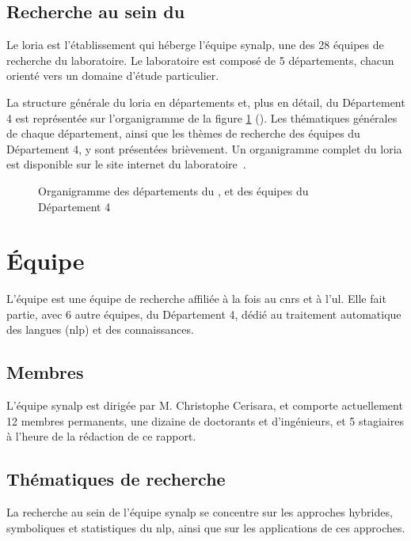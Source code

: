 \pagebreak
\subsection{Recherche au sein du }
Le \gls{loria} est l'établissement qui héberge l'équipe \gls{synalp}, une des 28 équipes de recherche du laboratoire. Le laboratoire est composé de 5 départements, chacun orienté vers un domaine d'étude particulier.

La structure générale du \gls{loria} en départements et, plus en détail, du Département 4 est représentée sur l'organigramme de la figure \ref{fig:dep_org} (). %
Les thématiques générales de chaque département, ainsi que les thèmes de recherche des équipes du Département 4, y sont présentées brièvement.
Un organigramme complet du \gls{loria} est disponible sur {le site internet du laboratoire~\autocite{org_loria}}.

\begin{figure}[h]
	\centering
	\scalebox{1}{}
	\caption{Organigramme des départements du , et des équipes du Département 4}
	\label{fig:dep_org}
\end{figure}

\pagebreak
\section{Équipe }
L'équipe  est une équipe de recherche affiliée à la fois au \gls{cnrs} et à l'\gls{ul}.
Elle fait partie, avec 6 autre équipes, du Département 4, dédié au traitement automatique des langues (\gls{nlp}) et des connaissances.

\subsection{Membres}
L'équipe \gls{synalp} est dirigée par M. Christophe Cerisara, et comporte actuellement 12 membres permanents, une dizaine de doctorants et d'ingénieurs, et 5 stagiaires à l'heure de la rédaction de ce rapport.

\subsection{Thématiques de recherche}
La recherche au sein de l'équipe \gls{synalp} se concentre sur les approches hybrides, symboliques et statistiques du \gls{nlp}, ainsi que sur les applications de ces approches.

